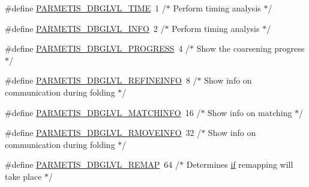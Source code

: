 \begin{DoxyCompactItemize}
\item 
\#define \hyperlink{a00843_a83335527ec28434827ba22669c20f519}{P\+A\+R\+M\+E\+T\+I\+S\+\_\+\+D\+B\+G\+L\+V\+L\+\_\+\+T\+I\+ME}~1      /$\ast$ Perform timing analysis $\ast$/
\item 
\#define \hyperlink{a00843_ad4d113bb626ca386dfbb86d6730c9d0d}{P\+A\+R\+M\+E\+T\+I\+S\+\_\+\+D\+B\+G\+L\+V\+L\+\_\+\+I\+N\+FO}~2      /$\ast$ Perform timing analysis $\ast$/
\item 
\#define \hyperlink{a00843_a6913cca439f729f0d831646979505f71}{P\+A\+R\+M\+E\+T\+I\+S\+\_\+\+D\+B\+G\+L\+V\+L\+\_\+\+P\+R\+O\+G\+R\+E\+SS}~4      /$\ast$ Show the coarsening progress $\ast$/
\item 
\#define \hyperlink{a00843_a483143525f038b8d1cc9876e104b2228}{P\+A\+R\+M\+E\+T\+I\+S\+\_\+\+D\+B\+G\+L\+V\+L\+\_\+\+R\+E\+F\+I\+N\+E\+I\+N\+FO}~8      /$\ast$ Show info on communication during folding $\ast$/
\item 
\#define \hyperlink{a00843_a2c17217243390b94295386f8cb1f853d}{P\+A\+R\+M\+E\+T\+I\+S\+\_\+\+D\+B\+G\+L\+V\+L\+\_\+\+M\+A\+T\+C\+H\+I\+N\+FO}~16     /$\ast$ Show info on matching $\ast$/
\item 
\#define \hyperlink{a00843_aff381af99e792c5a07a391f18bc1a6ea}{P\+A\+R\+M\+E\+T\+I\+S\+\_\+\+D\+B\+G\+L\+V\+L\+\_\+\+R\+M\+O\+V\+E\+I\+N\+FO}~32     /$\ast$ Show info on communication during folding $\ast$/
\item 
\#define \hyperlink{a00843_a38aa880d4f8c0dbda1800f21f606a1e1}{P\+A\+R\+M\+E\+T\+I\+S\+\_\+\+D\+B\+G\+L\+V\+L\+\_\+\+R\+E\+M\+AP}~64     /$\ast$ Determines \hyperlink{a00614_a96c738d3e2120c4273f9d4390761d99e}{if} remapping will take place $\ast$/
\end{DoxyCompactItemize}
